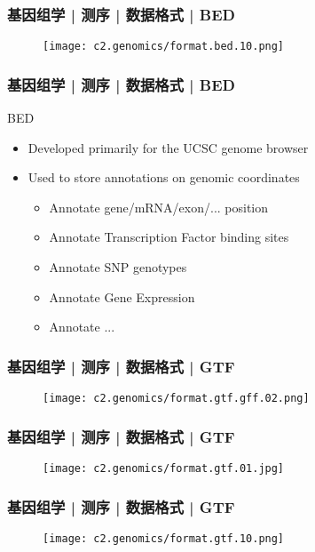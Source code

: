 \begin{frame}
  \frametitle{基因组学 | 测序 | 数据格式 | BED}
  \begin{figure}
    \centering
    \texttt{[image: c2.genomics/format.bed.10.png]}
  \end{figure}
\end{frame}

\begin{frame}
  \frametitle{基因组学 | 测序 | 数据格式 | BED}
  \begin{block}{BED}
    \begin{itemize}
      \item Developed primarily for the UCSC genome browser
      \item Used to store annotations on genomic coordinates
        \begin{itemize}
          \item Annotate gene/mRNA/exon/... position
          \item Annotate Transcription Factor binding sites
          \item Annotate SNP genotypes
          \item Annotate Gene Expression
          \item Annotate ...
        \end{itemize}
    \end{itemize}
  \end{block}
\end{frame}

\begin{frame}
  \frametitle{基因组学 | 测序 | 数据格式 | GTF}
  \begin{figure}
    \centering
    \texttt{[image: c2.genomics/format.gtf.gff.02.png]}
  \end{figure}
\end{frame}
    
\begin{frame}
  \frametitle{基因组学 | 测序 | 数据格式 | GTF}
  \begin{figure}
    \centering
    \texttt{[image: c2.genomics/format.gtf.01.jpg]}
  \end{figure}
\end{frame}
    
\begin{frame}
  \frametitle{基因组学 | 测序 | 数据格式 | GTF}
  \begin{figure}
    \centering
    \texttt{[image: c2.genomics/format.gtf.10.png]}
  \end{figure}
\end{frame}
    
